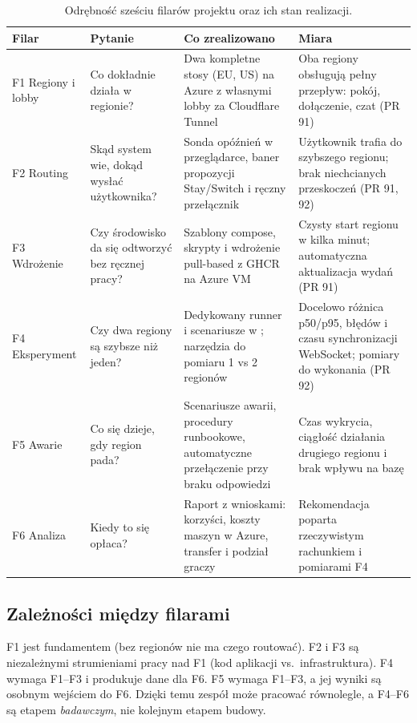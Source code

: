 \documentclass[12pt,a4paper]{article}
\newcommand{\code}[1]{\texttt{\detokenize{#1}}}
\begin{document}
\begin{table}[H]
\centering\footnotesize
\renewcommand{\arraystretch}{1.3}
\begin{tabularx}{\textwidth}{@{}l>{\raggedright\arraybackslash}p{}Y>{\raggedright\arraybackslash}p{0.2\textwidth}@{}}
\toprule
\textbf{Filar} & \textbf{Pytanie} & \textbf{Co zrealizowano} & \textbf{Miara} \\
\midrule
F1 Regiony i lobby & Co dokładnie działa w regionie? & Dwa kompletne stosy (EU, US) na Azure z własnymi lobby za Cloudflare Tunnel & Oba regiony obsługują pełny przepływ: pokój, dołączenie, czat (PR 91) \\
F2 Routing & Skąd system wie, dokąd wysłać użytkownika? & Sonda opóźnień w przeglądarce, baner propozycji Stay/Switch i ręczny przełącznik & Użytkownik trafia do szybszego regionu; brak niechcianych przeskoczeń (PR 91, 92) \\
F3 Wdrożenie & Czy środowisko da się odtworzyć bez ręcznej pracy? & Szablony compose, skrypty \code{deploy/deploy.sh} i wdrożenie pull-based z GHCR na Azure VM & Czysty start regionu w kilka minut; automatyczna aktualizacja wydań (PR 91) \\
F4 Eksperyment & Czy dwa regiony są szybsze niż jeden? & Dedykowany runner i scenariusze w \code{experiments/f4/}; narzędzia do pomiaru 1 vs 2 regionów & Docelowo różnica p50/p95, błędów i czasu synchronizacji WebSocket; pomiary do wykonania (PR 92) \\
F5 Awarie & Co się dzieje, gdy region pada? & Scenariusze awarii, procedury runbookowe, automatyczne przełączenie przy braku odpowiedzi & Czas wykrycia, ciągłość działania drugiego regionu i brak wpływu na bazę \\
F6 Analiza & Kiedy to się opłaca? & Raport z wnioskami: korzyści, koszty maszyn w Azure, transfer i podział graczy & Rekomendacja poparta rzeczywistym rachunkiem i pomiarami F4 \\
\bottomrule
\end{tabularx}
\caption{Odrębność sześciu filarów projektu oraz ich stan realizacji.}
\end{table}

\subsection{Zależności między filarami}
F1 jest fundamentem (bez regionów nie ma czego routować). F2 i F3 są niezależnymi
strumieniami pracy nad F1 (kod aplikacji vs.\ infrastruktura). F4 wymaga F1--F3 i
produkuje dane dla F6. F5 wymaga F1--F3, a jej wyniki są osobnym wejściem do F6.
Dzięki temu zespół może pracować równolegle, a F4--F6 są etapem \emph{badawczym},
nie kolejnym etapem budowy.
\end{document}
